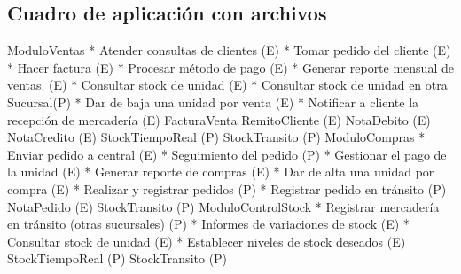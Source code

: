 \subsection{Cuadro de aplicación con archivos}

\begin{cuadroAplicacionArchivos}
  \cuadroAplicacionArchivosItem
    {ModuloVentas}
    {* Atender consultas de clientes (E) \newline
	 * Tomar pedido del cliente (E)\newline
 	 * Hacer factura (E)\newline
	 * Procesar método de pago (E)\newline
	 * Generar reporte mensual de ventas. (E)\newline
	 * Consultar stock de unidad (E)\newline
	 * Consultar stock de unidad en otra Sucursal(P)\newline
	 * Dar de baja una unidad por venta (E)\newline
	 * Notificar a cliente la recepción de mercadería (E)\newline
	}
	{FacturaVenta \newline
	 RemitoCliente (E)\newline
	 NotaDebito (E)\newline
	 NotaCredito (E)\newline
	 StockTiempoReal (P)\newline
	 StockTransito (P)\newline
	 }
  \cuadroAplicacionArchivosItem
    {ModuloCompras}
    {* Enviar pedido a central (E)\newline
	 * Seguimiento del pedido (P)\newline
	 * Gestionar el pago de la unidad (E)\newline
	 * Generar reporte de compras (E)\newline
	 * Dar de alta una unidad por compra (E)\newline
	 * Realizar y registrar pedidos (P)\newline
	 * Registrar pedido en tránsito (P)\newline
	}
	{NotaPedido (E) \newline
	 StockTransito (P)\newline}
  \cuadroAplicacionArchivosItem
    {ModuloControlStock}
    {* Registrar mercadería en tránsito (otras sucursales) (P)\newline
	 * Informes de variaciones de stock (E)\newline
	 * Consultar stock de unidad (E)\newline
	 * Establecer niveles de stock deseados (E)\newline
	 }
	{StockTiempoReal (P) \newline
	 StockTransito (P)\newline}
\end{cuadroAplicacionArchivos}

